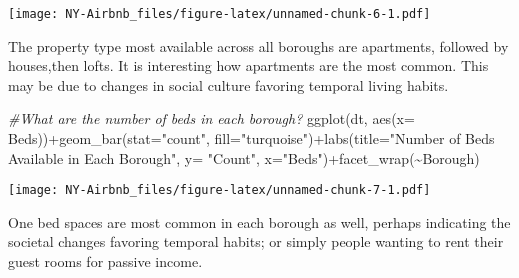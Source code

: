 \documentclass[
]{article}
\newenvironment{Shaded}{\begin{snugshade}}{\end{snugshade}}
\newcommand{\AttributeTok}[1]{\textcolor[rgb]{0.77,0.63,0.00}{#1}}
\newcommand{\CommentTok}[1]{\textcolor[rgb]{0.56,0.35,0.01}{\textit{#1}}}
\newcommand{\FunctionTok}[1]{\textcolor[rgb]{0.00,0.00,0.00}{#1}}
\newcommand{\NormalTok}[1]{#1}
\newcommand{\SpecialCharTok}[1]{\textcolor[rgb]{0.00,0.00,0.00}{#1}}
\newcommand{\StringTok}[1]{\textcolor[rgb]{0.31,0.60,0.02}{#1}}
\begin{document}
\texttt{[image: NY-Airbnb\_files/figure-latex/unnamed-chunk-6-1.pdf]}

The property type most available across all boroughs are apartments,
followed by houses,then lofts. It is interesting how apartments are the
most common. This may be due to changes in social culture favoring
temporal living habits.

\begin{Shaded}
\begin{Highlighting}[]
\CommentTok{\#What are the number of beds in each borough?}
\FunctionTok{ggplot}\NormalTok{(dt, }\FunctionTok{aes}\NormalTok{(}\AttributeTok{x=}\NormalTok{ Beds))}\SpecialCharTok{+}\FunctionTok{geom\_bar}\NormalTok{(}\AttributeTok{stat=}\StringTok{"count"}\NormalTok{, }\AttributeTok{fill=}\StringTok{"turquoise"}\NormalTok{)}\SpecialCharTok{+}\FunctionTok{labs}\NormalTok{(}\AttributeTok{title=}\StringTok{"Number of Beds Available in Each Borough"}\NormalTok{, }\AttributeTok{y=} \StringTok{"Count"}\NormalTok{, }\AttributeTok{x=}\StringTok{"Beds"}\NormalTok{)}\SpecialCharTok{+}\FunctionTok{facet\_wrap}\NormalTok{(}\SpecialCharTok{\textasciitilde{}}\NormalTok{Borough)}
\end{Highlighting}
\end{Shaded}

\texttt{[image: NY-Airbnb\_files/figure-latex/unnamed-chunk-7-1.pdf]}

One bed spaces are most common in each borough as well, perhaps
indicating the societal changes favoring temporal habits; or simply
people wanting to rent their guest rooms for passive income.

\begin{Shaded}
\end{Shaded}
\end{document}
